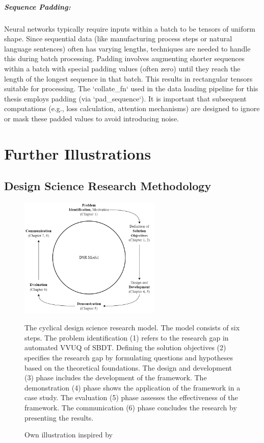 \begin{appendices}
  \paragraph{Sequence Padding:}
  Neural networks typically require inputs within a batch to be tensors of uniform shape. Since sequential data (like manufacturing process steps or natural language sentences) often has varying lengths, techniques are needed to handle this during batch processing. Padding involves augmenting shorter sequences within a batch with special padding values (often zero) until they reach the length of the longest sequence in that batch. This results in rectangular tensors suitable for processing. The `collate\_fn` used in the data loading pipeline for this thesis employs padding (via `pad\_sequence`). It is important that subsequent computations (e.g., loss calculation, attention mechanisms) are designed to ignore or mask these padded values to avoid introducing noise.

  \chapter{Further Illustrations}

  \section{Design Science Research Methodology}
  \begin{figure}[H]
    \centering
    \includegraphics[width=0.6\textwidth]{figures/dsr.png}
    \caption[Design Science Methodology]{The cyclical design science research model. The model consists of six steps. The problem identification (1) refers to the research gap in automated VVUQ of SBDT. Defining the solution objectives (2) specifies the research gap by formulating questions and hypotheses based on the theoretical foundations. The design and development (3) phase includes the development of the framework. The demonstration (4) phase shows the application of the framework in a case study. The evaluation (5) phase assesses the effectiveness of the framework. The communication (6) phase concludes the research by presenting the results.}
    \label{fig:DSR}
    \caption*{Own illustration inspired by \textcite{peffers2007design}}
  \end{figure}


\end{appendices}
